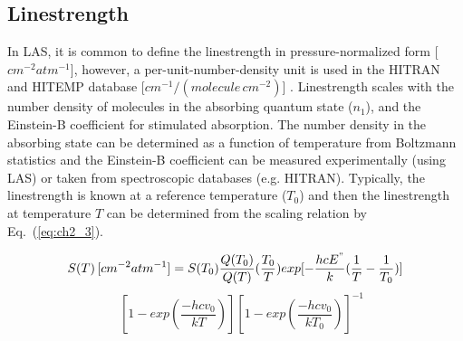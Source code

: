 

\subsection{Linestrength}
In LAS, it is common to define the linestrength in pressure-normalized form [$cm^{-2}atm^{-1}$], however, a per-unit-number-density unit is used in the HITRAN and HITEMP database [$cm^{-1}/(molecule \, cm^{-2})$] \cite{2013JQSRT.130....4R}. Linestrength scales with the number density of molecules in the absorbing quantum state ($n_1$), and the Einstein-B coefficient for stimulated absorption. The number density in the absorbing state can be determined as a function of temperature from Boltzmann statistics and the Einstein-B coefficient can be measured experimentally (using LAS) or taken from spectroscopic databases (e.g. HITRAN). Typically, the linestrength is known at a reference temperature ($T_0$) and then the linestrength at temperature $T$ can be determined from the scaling relation by Eq.\ (\ref{eq:ch2_3}). 

\begin{equation*}
S(T)\,[cm^{-2}atm^{-1}]=S(T_0)\frac{Q(T_0)}{Q(T)}(\frac{T_0}{T})exp[-\frac{hcE^"}{k}(\frac{1}{T}-\frac{1}{T_0})] 
\end{equation*}
\begin{equation}\label{eq:ch2_3}
\quad[1-exp(\frac{-hcv_{0}}{kT})][1-exp(\frac{-hcv_{0}}{kT_0})]^{-1}  
\end{equation}

